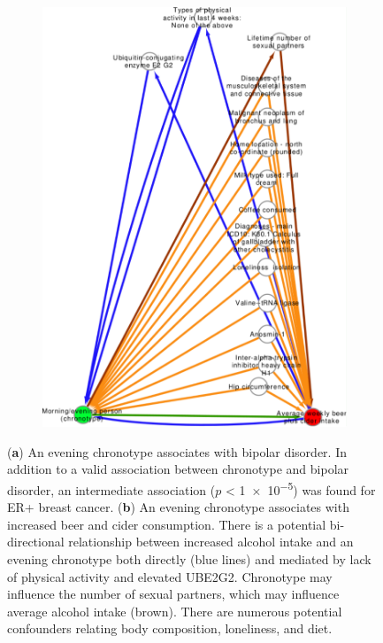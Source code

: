 \documentclass[genes,article,accept,moreauthors,pdftex]{Definitions/mdpi}
\begin{document}
\begin{paracol}{2}
\begin{figure}[H]
{\begin{subfigure}{.65\linewidth}
	\includegraphics[width=0.95\linewidth,keepaspectratio]{Figs/Analysis3/new_chrono_beer.pdf}
\caption{}
\label{chronoBeer}
\end{subfigure}}
\caption{(\textbf{a}) An evening chronotype associates with bipolar disorder. In addition to a valid association between chronotype and bipolar disorder, an intermediate association ($p$ < \num{1e-5}) was found for ER+ breast cancer. (\textbf{b}) An evening chronotype associates with increased beer and cider consumption. There is a potential bi-directional relationship between increased alcohol intake and an evening chronotype both directly (blue lines) and mediated by lack of physical activity and elevated UBE2G2. Chronotype may influence the number of sexual partners, which may influence average alcohol intake ({brown}). There are numerous potential confounders relating body composition, loneliness, and diet.}
\label{chronoBeerBipolar}
\end{figure}





\end{paracol}
\end{document}
